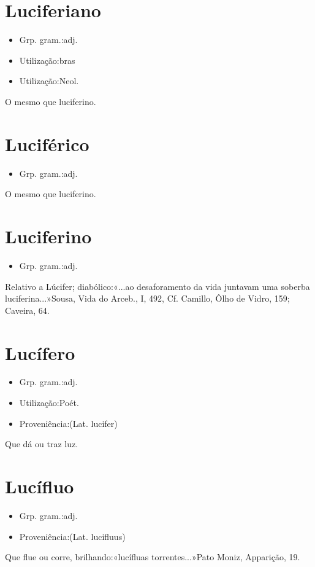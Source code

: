 \section{Luciferiano}
\begin{itemize}
\item {Grp. gram.:adj.}
\end{itemize}
\begin{itemize}
\item {Utilização:bras}
\end{itemize}
\begin{itemize}
\item {Utilização:Neol.}
\end{itemize}
O mesmo que \textunderscore luciferino\textunderscore .
\section{Luciférico}
\begin{itemize}
\item {Grp. gram.:adj.}
\end{itemize}
O mesmo que \textunderscore luciferino\textunderscore .
\section{Luciferino}
\begin{itemize}
\item {Grp. gram.:adj.}
\end{itemize}
Relativo a Lúcifer; diabólico:«\textunderscore ...ao desaforamento da vida juntavam uma soberba luciferina...\textunderscore »Sousa, \textunderscore Vida do Arceb.\textunderscore , I, 492, Cf. Camillo, \textunderscore Ôlho de Vidro\textunderscore , 159; \textunderscore Caveira\textunderscore , 64.
\section{Lucífero}
\begin{itemize}
\item {Grp. gram.:adj.}
\end{itemize}
\begin{itemize}
\item {Utilização:Poét.}
\end{itemize}
\begin{itemize}
\item {Proveniência:(Lat. \textunderscore lucifer\textunderscore )}
\end{itemize}
Que dá ou traz luz.
\section{Lucífluo}
\begin{itemize}
\item {Grp. gram.:adj.}
\end{itemize}
\begin{itemize}
\item {Proveniência:(Lat. \textunderscore lucifluus\textunderscore )}
\end{itemize}
Que flue ou corre, brilhando:«\textunderscore lucífluas torrentes...\textunderscore »Pato Moniz, \textunderscore Apparição\textunderscore , 19.
